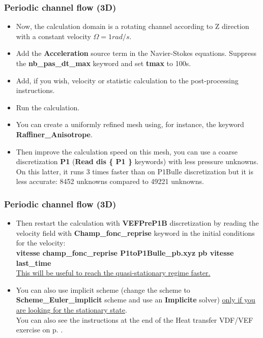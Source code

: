 \documentclass[10pt, hyperref={unicode=true,pdfusetitle, bookmarks=true,bookmarksnumbered=false,bookmarksopen=false, breaklinks=false,pdfborder={0 0 1},backref=true,colorlinks=true,linkcolor=darkblue,pageanchor}]{beamer}
\begin{document}
\begin{frame}
\frametitle{Periodic channel flow (3D)}
\begin{block}{}

\begin{itemize}
\item Now, the calculation domain is a rotating channel according to Z direction with a constant velocity $\Omega=1 rad/s$. 

\item Add the \textbf{Acceleration} source term in the Navier-Stokes equations. Suppress the \textbf{nb\_pas\_dt\_max} keyword and set \textbf{tmax} to 100s.

\item Add, if you wish, velocity or statistic calculation to the post-processing instructions. 

\item Run the calculation.

\item You can create a uniformly refined mesh using, for instance, the keyword \textbf{Raffiner\_Anisotrope}.

\item Then improve the calculation speed on this mesh, you can use a coarse discretization \textbf{P1} (\textbf{Read dis \{ P1 \}} keywords) with less pressure unknowns. On this latter, it runs 3 times faster than on P1Bulle discretization but it is less accurate: 8452 unknowns compared to 49221 unknowns.
\end{itemize}

\end{block}
\end{frame}
\begin{frame}
\frametitle{Periodic channel flow (3D)}
\begin{block}{}

\begin{itemize}
\item Then restart the calculation with \textbf{VEFPreP1B} discretization by reading the velocity field with \textbf{Champ\_fonc\_reprise} keyword in the initial conditions for the velocity:\\
\textbf{vitesse champ\_fonc\_reprise P1toP1Bulle\_pb.xyz  pb  vitesse  last\_time} \\
\underline{This will be useful to reach the quasi-stationary regime faster.}

\item You can also use implicit scheme (change the scheme to \textbf{Scheme\_Euler\_implicit} scheme and use an \textbf{Implicite} solver) \underline{only if you are looking for the stationary state}.\\ 
You can also see the instructions at the end of the Heat transfer VDF/VEF exercise on p. \pageref{schema_impl}.
\end{itemize}

\end{block}
\end{frame}
\end{document}
